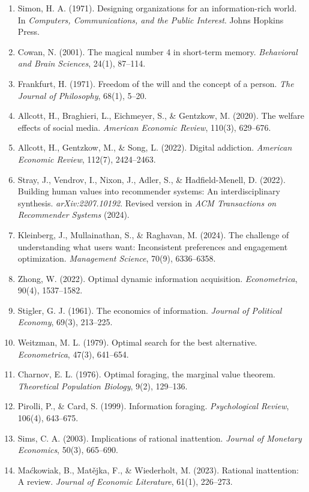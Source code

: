 \documentclass[
  chinese,
  11pt]{article}
\begin{document}
\begin{enumerate}
\def\labelenumi{\arabic{enumi}.}
\item
  Simon, H. A. (1971). Designing organizations for an information-rich world. In \emph{Computers, Communications, and the Public Interest}. Johns Hopkins Press.
\item
  Cowan, N. (2001). The magical number 4 in short-term memory. \emph{Behavioral and Brain Sciences}, 24(1), 87--114.
\item
  Frankfurt, H. (1971). Freedom of the will and the concept of a person. \emph{The Journal of Philosophy}, 68(1), 5--20.
\item
  Allcott, H., Braghieri, L., Eichmeyer, S., \& Gentzkow, M. (2020). The welfare effects of social media. \emph{American Economic Review}, 110(3), 629--676.
\item
  Allcott, H., Gentzkow, M., \& Song, L. (2022). Digital addiction. \emph{American Economic Review}, 112(7), 2424--2463.
\item
  Stray, J., Vendrov, I., Nixon, J., Adler, S., \& Hadfield-Menell, D. (2022). Building human values into recommender systems: An interdisciplinary synthesis. \emph{arXiv:2207.10192}. Revised version in \emph{ACM Transactions on Recommender Systems} (2024).
\item
  Kleinberg, J., Mullainathan, S., \& Raghavan, M. (2024). The challenge of understanding what users want: Inconsistent preferences and engagement optimization. \emph{Management Science}, 70(9), 6336--6358.
\item
  Zhong, W. (2022). Optimal dynamic information acquisition. \emph{Econometrica}, 90(4), 1537--1582.
\item
  Stigler, G. J. (1961). The economics of information. \emph{Journal of Political Economy}, 69(3), 213--225.
\item
  Weitzman, M. L. (1979). Optimal search for the best alternative. \emph{Econometrica}, 47(3), 641--654.
\item
  Charnov, E. L. (1976). Optimal foraging, the marginal value theorem. \emph{Theoretical Population Biology}, 9(2), 129--136.
\item
  Pirolli, P., \& Card, S. (1999). Information foraging. \emph{Psychological Review}, 106(4), 643--675.
\item
  Sims, C. A. (2003). Implications of rational inattention. \emph{Journal of Monetary Economics}, 50(3), 665--690.
\item
  Maćkowiak, B., Matějka, F., \& Wiederholt, M. (2023). Rational inattention: A review. \emph{Journal of Economic Literature}, 61(1), 226--273.

\end{enumerate}
\end{document}
